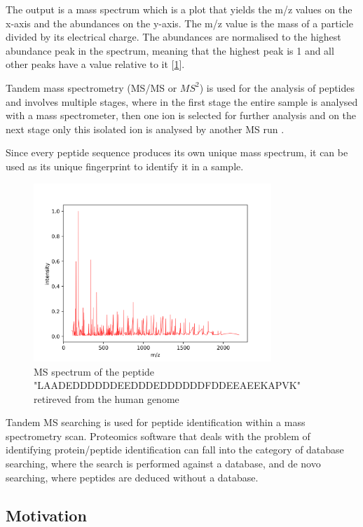 \documentclass[11pt]{article}
\begin{document}
The output is a mass spectrum which is a plot that yields the m/z values on the x-axis and the abundances on the y-axis. The m/z value is the mass of a particle divided by its electrical charge. The abundances are normalised to the highest abundance peak in the spectrum, meaning that the highest peak is 1 and all other peaks have a value relative to it [\cref{fig:peptide-example}]. 

Tandem mass spectrometry (MS/MS or \(MS^2\)) is used for the analysis of peptides and involves multiple stages, where in the first stage the entire sample is analysed with a mass spectrometer, then one ion is selected for further analysis and on the next stage only this isolated ion is analysed by another MS run \cite{tandem-mass-spectrometry}. 

Since every peptide sequence produces its own unique mass spectrum, it can be used as its unique fingerprint to identify it in a sample. 
\begin{figure}[ht]
\centering
\includegraphics[width=0.8\textwidth]{figs/peptide.png}
\caption{MS spectrum of the peptide "LAADEDDDDDDEEDDDEDDDDDDFDDEEAEEKAPVK" retireved from the human genome}
\label{fig:peptide-example}
\end{figure}

Tandem MS searching is used for peptide identification within a mass spectrometry scan. Proteomics software that deals with the problem of identifying protein/peptide identification can fall into the category of database searching, where the search is performed against a database, and de novo searching, where peptides are deduced without a database.

\subsection{Motivation}
\end{document}
